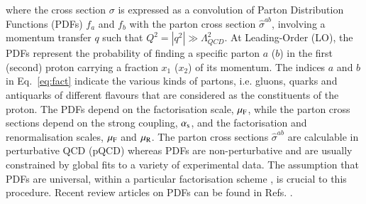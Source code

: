 where the cross section $\sigma$
is expressed
as a convolution of Parton Distribution Functions (PDFs) $f_a$ and $f_b$
with the parton cross section
$\hat{\sigma}^{ab}$,  involving a momentum transfer 
$q$ such that $Q^2 = |q^2| \gg \Lambda_{QCD}^2$. 
%
At Leading-Order (LO), the PDFs represent 
the probability of finding a specific parton $a$ ($b$) in the first (second) proton carrying a fraction $x_1$ ($x_2$) of its momentum.
%
The indices $a$ and $b$ in Eq.~\ref{eq:fact} indicate the various 
kinds of partons,
i.e. gluons, quarks and antiquarks of different flavours
that are considered
as the constituents of the proton.
%
The PDFs depend on the factorisation scale, $\mu_\mathrm{F}$, while the parton cross sections depend on the strong coupling,
$\alpha_\mathrm{s}$, and the factorisation and renormalisation scales,
$\mu_\mathrm{F}$ and $\mu_\mathrm{R}$.
%
The parton cross sections $\hat\sigma^{ab}$ are calculable in perturbative QCD (pQCD) whereas
PDFs are non-perturbative and are usually constrained by global fits to a variety of experimental data. The assumption that PDFs are universal, within a particular factorisation scheme \cite{Collins:1981uw,Collins:1983ju,Collins:1985ue,Collins:1989gx,Collins:2011zzd}, is crucial to this procedure.
Recent review articles on PDFs can be found in Refs. \cite{Perez:2012um,Forte:2013wc}. 
%
%

